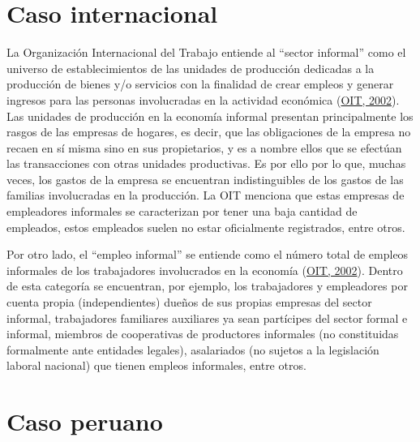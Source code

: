 \documentclass[
  letterpaper,
  12pt,
  oneside,
  spanish,
  doublespacing,
  headsepline,
  parskip]{MastersDoctoralThesis}
\begin{document}
\hypertarget{caso-internacional}{%
\section{Caso internacional}\label{caso-internacional}}

La Organización Internacional del Trabajo entiende al ``sector
informal'' como el universo de establecimientos de las unidades de
producción dedicadas a la producción de bienes y/o servicios con la
finalidad de crear empleos y generar ingresos para las personas
involucradas en la actividad económica
(\protect\hyperlink{ref-oit2002}{OIT, 2002}). Las unidades de producción
en la economía informal presentan principalmente los rasgos de las
empresas de hogares, es decir, que las obligaciones de la empresa no
recaen en sí misma sino en sus propietarios, y es a nombre ellos que se
efectúan las transacciones con otras unidades productivas. Es por ello
por lo que, muchas veces, los gastos de la empresa se encuentran
indistinguibles de los gastos de las familias involucradas en la
producción. La OIT menciona que estas empresas de empleadores informales
se caracterizan por tener una baja cantidad de empleados, estos
empleados suelen no estar oficialmente registrados, entre otros.

Por otro lado, el ``empleo informal'' se entiende como el número total
de empleos informales de los trabajadores involucrados en la economía
(\protect\hyperlink{ref-oit2002}{OIT, 2002}). Dentro de esta categoría
se encuentran, por ejemplo, los trabajadores y empleadores por cuenta
propia (independientes) dueños de sus propias empresas del sector
informal, trabajadores familiares auxiliares ya sean partícipes del
sector formal e informal, miembros de cooperativas de productores
informales (no constituidas formalmente ante entidades legales),
asalariados (no sujetos a la legislación laboral nacional) que tienen
empleos informales, entre otros.

\hypertarget{caso-peruano}{%
\section{Caso peruano}\label{caso-peruano}}
\end{document}
